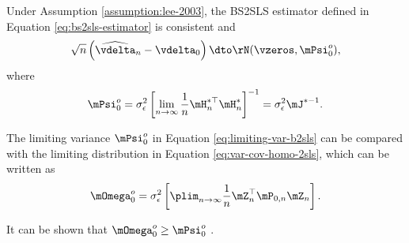 \documentclass[english,12pt]{book}\usepackage[]{graphicx}\usepackage[]{xcolor}
\begin{document}
\begin{theorem}\label{teo:BS2SLS_est_slm}
Under Assumption \ref{assumption:lee-2003}, the BS2SLS estimator defined in Equation \eqref{eq:bs2sls-estimator} is consistent and
\begin{equation*}
  \sqrt{n}\left(\widehat{\vdelta}_n - \vdelta_0\right) \dto \rN(\vzeros, \mPsi_0^o), 
\end{equation*}
where
\begin{equation}\label{eq:limiting-var-b2sls}
\mPsi_0^o = \sigma_{\epsilon}^2\left[\lim_{n\to\infty} \frac{1}{n}\mH^{*\top}_n \mH_n^*\right]^{-1} = \sigma_{\epsilon}^2\mJ^{*-1}.
\end{equation}
\end{theorem}

The limiting variance $\mPsi_0^o$ in Equation \eqref{eq:limiting-var-b2sls} can be compared with the limiting distribution in Equation \eqref{eq:var-cov-homo-2sls}, which can be written as
\begin{equation*}
\mOmega_0^o = \sigma_{\epsilon}^2\left[\plim_{n\to\infty}\frac{1}{n}\mZ^\top_n\mP_{0, n}\mZ_n\right].
\end{equation*}

It can be shown that $\mOmega_0^o \geq \mPsi_0^o$ \citep[see][]{lee2003best}. 
\end{document}
